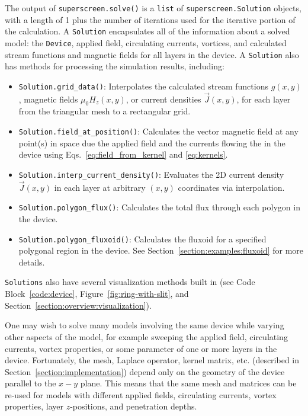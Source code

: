\documentclass[final,3p,times,twocolumn]{elsarticle}
\newcommand{\inline}[1]{\texttt{#1}\xspace}
\begin{document}
The output of \inline{superscreen.solve()} is a \inline{list} of \inline{superscreen.Solution} objects, with a length of 1 plus the number of iterations used for the iterative portion of the calculation. A \inline{Solution} encapsulates all of the information about a solved model: the \inline{Device}, applied field, circulating currents, vortices, and calculated stream functions and magnetic fields for all layers in the device. A \inline{Solution} also has methods for processing the simulation results, including:
\begin{itemize}
    \item{
    \inline{Solution.grid_data()}: Interpolates the calculated stream functions $g(x, y)$, magnetic fields $\mu_0H_z(x, y)$, or current densities $\vec{J}(x, y)$, for each layer from the triangular mesh to a rectangular grid.
    }
    \item{
    \inline{Solution.field_at_position()}: Calculates the vector magnetic field at any point(s) in space due the applied field and the currents flowing the in the device using Eqs.~\ref{eq:field_from_kernel} and \ref{eq:kernels}.
    }
    \item{
    \inline{Solution.interp_current_density()}: Evaluates the 2D current density $\vec{J}(x, y)$ in each layer at arbitrary $(x, y)$ coordinates via interpolation.
    }
    \item{
    \inline{Solution.polygon_flux()}: Calculates the total flux through each polygon in the device.
    }
    \item{
    \inline{Solution.polygon_fluxoid()}: Calculates the fluxoid for a specified polygonal region in the device. See Section~\ref{section:examples:fluxoid} for more details.
    }
\end{itemize}
\inline{Solutions} also have several visualization methods built in (see Code Block~\ref{code:device}, Figure~\ref{fig:ring-with-slit}, and Section~\ref{section:overview:visualization}).

One may wish to solve many models involving the same device while varying other aspects of the model, for example sweeping the applied field, circulating currents, vortex properties, or some parameter of one or more layers in the device. Fortunately, the mesh, Laplace operator, kernel matrix, etc. (described in Section~\ref{section:implementation}) depend only on the geometry of the device parallel to the $x-y$ plane. This means that the same mesh and matrices can be re-used for models with different applied fields, circulating currents, vortex properties, layer $z$-positions, and penetration depths.
\end{document}
